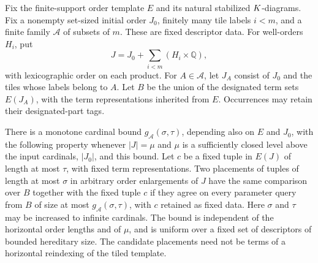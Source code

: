 \begin{lemma}
\label{exact:tiled-testing}
Fix the finite-support order template $E$ and its natural stabilized
$K$-diagrams.  Fix a nonempty set-sized initial order $J_0$, finitely many tile
labels $i<m$, and a finite family $\mathcal A$ of subsets of $m$.
These are fixed descriptor data.  For well-orders $H_i$, put
\[
 J=J_0+\sum_{i<m}(H_i\times\mathbb Q),
\]
with lexicographic order on each product.  For $A\in\mathcal A$, let
$J_A$ consist of $J_0$ and the tiles whose labels belong to $A$.
Let $B$ be the union of the designated term sets $E(J_A)$, with the
term representations inherited from $E$.  Occurrences may retain
their designated-part tags.

There is a monotone cardinal bound $g_{\mathcal A}(\sigma,\tau)$,
depending also on $E$ and $J_0$, with the following property whenever
$|J|=\mu$ and $\mu$ is a sufficiently closed level above the input
cardinals, $|J_0|$, and this bound.  Let $c$ be a
fixed tuple in $E(J)$ of length at most $\tau$, with fixed term
representations.  Two placements of tuples of length at most
$\sigma$ in arbitrary order enlargements of $J$ have the same
comparison over $B$ together with the fixed tuple $c$ if they agree
on every parameter query from $B$ of size at most
$g_{\mathcal A}(\sigma,\tau)$, with $c$ retained as fixed data.
Here $\sigma$ and $\tau$ may be increased to infinite cardinals.
The bound is independent of the horizontal order lengths and of
$\mu$, and is uniform over a fixed set of descriptors of bounded
hereditary size.  The candidate placements need not be terms of a
horizontal reindexing of the tiled template.
\end{lemma}

